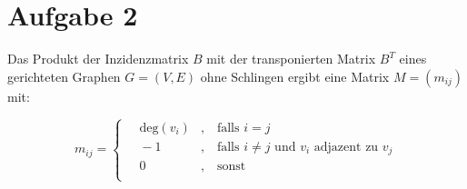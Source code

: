 \section*{Aufgabe 2}

Das Produkt der Inzidenzmatrix $B$ mit der transponierten Matrix $B^T$ eines gerichteten Graphen $G = (V, E )$ ohne Schlingen ergibt eine Matrix $M = (m_{ij})$ mit:

\[ m_{ij} =
  \begin{cases}
    \quad \mathrm{deg}(v_i) & \text{,} \quad \text{falls } i = j \\
    \quad -1 & \text{,} \quad \text{falls } i \neq j \text{ und } v_i \text{ adjazent zu } v_j \\
    \quad 0 & \text{,} \quad \text{sonst} \\
  \end{cases}
\]